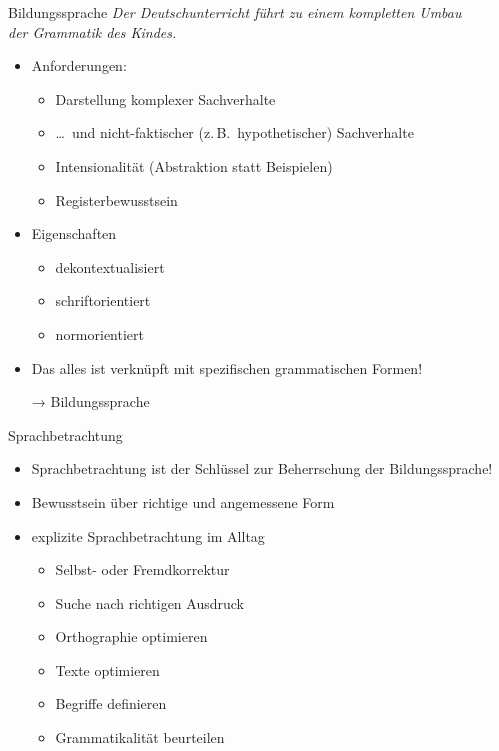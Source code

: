 \begin{frame}
  {Bildungssprache}
  \onslide<+->
  \onslide<+->
  \alert{\textit{Der Deutschunterricht führt zu einem kompletten Umbau\\
  der Grammatik des Kindes.}} \\
  \Zeile
  \begin{itemize}[<+->]
    \item Anforderungen:
    \begin{itemize}[<+->]
      \item Darstellung komplexer Sachverhalte
      \item \dots\ und nicht-faktischer (z.\,B.\ hypothetischer) Sachverhalte
      \item Intensionalität (Abstraktion statt Beispielen)
      \item Registerbewusstsein
    \end{itemize}
       \Halbzeile 
      \item Eigenschaften
    \begin{itemize}[<+->]
      \item dekontextualisiert
      \item schriftorientiert
      \item normorientiert
    \end{itemize}
        \Halbzeile
      \item \alert{Das alles ist verknüpft mit spezifischen grammatischen Formen!}
      \item[→] \alert{Bildungssprache}
  \end{itemize}
\end{frame}

\begin{frame}
  {Sprachbetrachtung}
  \onslide<+->
  \begin{itemize}[<+->]
    \item \alert{Sprachbetrachtung ist der Schlüssel zur Beherrschung der Bildungssprache!}
     \Zeile 
    \item Bewusstsein über richtige und angemessene Form
     \Zeile 
    \item explizite Sprachbetrachtung im Alltag
      \Halbzeile
      \begin{itemize}[<+->]
        \item Selbst- oder Fremdkorrektur
        \item Suche nach richtigen Ausdruck
        \item Orthographie optimieren
        \item Texte optimieren
        \item Begriffe definieren
        \item Grammatikalität beurteilen
      \end{itemize}
  \end{itemize}
\end{frame}

